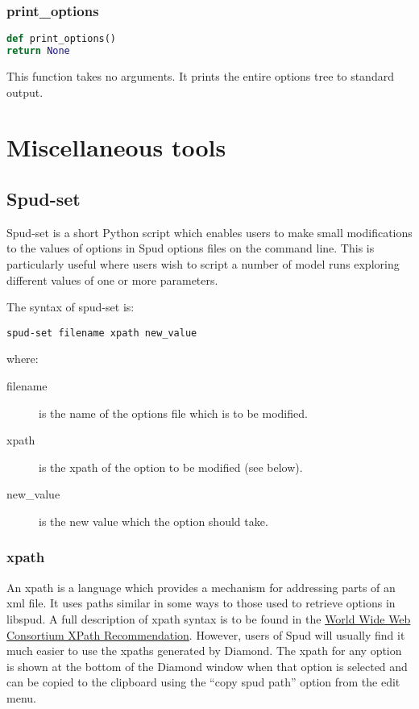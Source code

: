 \documentclass[a4paper, 11pt]{book}
\begin{document}
\subsection{print\_options}

\begin{lstlisting}[language=Python]
def print_options()
return None
\end{lstlisting}

This function takes no arguments.
It prints the entire options tree to standard output.



\chapter{Miscellaneous tools}

\section{Spud-set}

Spud-set is a short Python script which enables users to make small
modifications to the values of options in Spud options files on the command
line. This is particularly useful where users wish to script a number of
model runs exploring different values of one or more parameters.

The syntax of spud-set is:
\begin{verbatim}
spud-set filename xpath new_value
\end{verbatim}
where:
\begin{description}
\item[filename] is the name of the options file which is to be modified.
\item[xpath] is the xpath of the option to be modified (see below).
\item[new\_value] is the new value which the option should take.
\end{description}

\subsection{xpath}

An xpath is a language which provides a mechanism for addressing parts of an
xml file. It uses paths similar in some ways to those used to retrieve
options in libspud. A full description of xpath syntax is to be found in the
\href{http://www.w3.org/TR/xpath}{World Wide Web Consortium XPath
  Recommendation}. However, users of Spud will usually find it much easier
to use the xpaths generated by Diamond. The xpath for any option is shown at
the bottom of the Diamond window when that option is selected and can be
copied to the clipboard using the ``copy spud path'' option from the edit menu.
\end{document}
